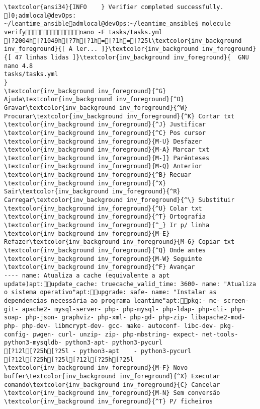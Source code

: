 \documentclass{scrartcl}
\begin{document}
\begin{Verbatim}
\textcolor{ansi34}{INFO    } Verifier completed successfully.
]0;admlocal@devOps: ~/leantime_ansibleadmlocal@devOps:~/leantime_ansible$ molecule verifynano -F tasks/tasks.yml 
[?2004h[?1049h[?7h[?1h=[?1h=[?25l\textcolor{inv_background inv_foreground}{[ A ler... ]}\textcolor{inv_background inv_foreground}{[ 47 linhas lidas ]}\textcolor{inv_background inv_foreground}{  GNU nano 4.8                                                                          tasks/tasks.yml                                                                                      }
\textcolor{inv_background inv_foreground}{^G} Ajuda\textcolor{inv_background inv_foreground}{^O} Gravar\textcolor{inv_background inv_foreground}{^W} Procurar\textcolor{inv_background inv_foreground}{^K} Cortar txt    \textcolor{inv_background inv_foreground}{^J} Justificar    \textcolor{inv_background inv_foreground}{^C} Pos cursor    \textcolor{inv_background inv_foreground}{M-U} Desfazer     \textcolor{inv_background inv_foreground}{M-A} Marcar txt   \textcolor{inv_background inv_foreground}{M-]} Parênteses   \textcolor{inv_background inv_foreground}{M-Q} Anterior     \textcolor{inv_background inv_foreground}{^B} Recuar
\textcolor{inv_background inv_foreground}{^X} Sair\textcolor{inv_background inv_foreground}{^R} Carregar\textcolor{inv_background inv_foreground}{^\} Substituir    \textcolor{inv_background inv_foreground}{^U} Colar txt     \textcolor{inv_background inv_foreground}{^T} Ortografia    \textcolor{inv_background inv_foreground}{^_} Ir p/ linha   \textcolor{inv_background inv_foreground}{M-E} Refazer\textcolor{inv_background inv_foreground}{M-6} Copiar txt   \textcolor{inv_background inv_foreground}{^Q} Onde antes    \textcolor{inv_background inv_foreground}{M-W} Seguinte     \textcolor{inv_background inv_foreground}{^F} Avançar
---- name: Atualiza a cache (equivalente a apt update)apt:update_cache: truecache_valid_time: 3600- name: "Atualiza o sistema operativo"apt:upgrade: safe- name: "Instalar as dependencias necessária ao programa leantime"apt:pkg:- mc- screen- git- apache2- mysql-server- php- php-mysql- php-ldap- php-cli- php-soap- php-json- graphviz- php-xml- php-gd- php-zip- libapache2-mod-php- php-dev- libmcrypt-dev- gcc- make- autoconf- libc-dev- pkg-config- pwgen- curl- unzip- zip- php-mbstring- expect- net-tools- python3-mysqldb- python3-apt- python3-pycurl
[?12l[?25h[?25l - python3-apt    - python3-pycurl
[?12l[?25h[?25l[?12l[?25h[?25l                                \textcolor{inv_background inv_foreground}{M-F} Novo buffer\textcolor{inv_background inv_foreground}{^X} Executar comando\textcolor{inv_background inv_foreground}{C} Cancelar           \textcolor{inv_background inv_foreground}{M-N} Sem conversão       \textcolor{inv_background inv_foreground}{^T} P/ ficheiros

\end{Verbatim}
\end{document}

